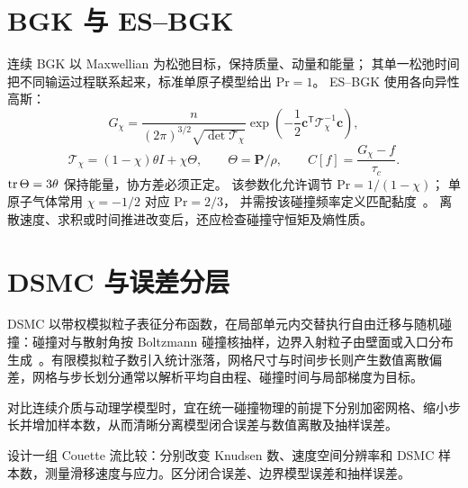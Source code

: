 \section{BGK 与 ES--BGK}
连续 BGK 以 Maxwellian 为松弛目标，保持质量、动量和能量；
其单一松弛时间把不同输运过程联系起来，标准单原子模型给出 $\mathrm{Pr}=1$。
ES--BGK 使用各向异性高斯：
\[
G_\chi=\frac{n}{(2\pi)^{3/2}\sqrt{\det\mathcal T_\chi}}
\exp\left(-\frac12\bm c^{\mathsf T}\mathcal T_\chi^{-1}\bm c\right),
\]
\[
\mathcal T_\chi=(1-\chi)\theta I+\chi\Theta,\qquad
\Theta=\bm P/\rho,\qquad
C[f]=\frac{G_\chi-f}{\tau_c}.
\]
$\operatorname{tr}\Theta=3\theta$ 保持能量，协方差必须正定。
该参数化允许调节 $\mathrm{Pr}=1/(1-\chi)$；
单原子气体常用 $\chi=-1/2$ 对应 $\mathrm{Pr}=2/3$，
并需按该碰撞频率定义匹配黏度~\cite{holway1966}。
离散速度、求积或时间推进改变后，还应检查碰撞守恒矩及熵性质。

\section{DSMC 与误差分层}
DSMC 以带权模拟粒子表征分布函数，在局部单元内交替执行自由迁移与随机碰撞：碰撞对与散射角按 Boltzmann 碰撞核抽样，边界入射粒子由壁面或入口分布生成~\cite{bird1994}。有限模拟粒子数引入统计涨落，网格尺寸与时间步长则产生数值离散偏差，网格与步长划分通常以解析平均自由程、碰撞时间与局部梯度为目标。

对比连续介质与动理学模型时，宜在统一碰撞物理的前提下分别加密网格、缩小步长并增加样本数，从而清晰分离模型闭合误差与数值离散及抽样误差。

{设计一组 Couette 流比较：分别改变 Knudsen 数、速度空间分辨率和 DSMC 样本数，测量滑移速度与应力。区分闭合误差、边界模型误差和抽样误差。}
